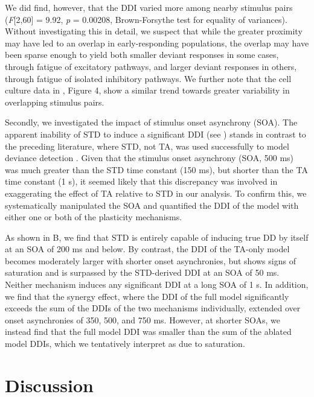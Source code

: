 \documentclass[9pt,lineno,onehalfspacing]{elife}
\begin{document}
We did find, however, that the DDI varied more among nearby stimulus pairs (\textit{F}[2,60] = 9.92, \textit{p} = 0.00208, Brown-Forsythe test for equality of variances). Without investigating this in detail, we suspect that while the greater proximity may have led to an overlap in early-responding populations, the overlap may have been sparse enough to yield both smaller deviant responses in some cases, through fatigue of excitatory pathways, and larger deviant responses in others, through fatigue of isolated inhibitory pathways. We further note that the cell culture data in \cite{Kubota2021-dx}, Figure 4, show a similar trend towards greater variability in overlapping stimulus pairs.

Secondly, we investigated the impact of stimulus onset asynchrony (SOA). The apparent inability of STD to induce a significant DDI (see ) stands in contrast to the preceding literature, where STD, not TA, was used successfully to model deviance detection \citep{Mill2011-ah, May2015-lt, Yarden2017-eh}. Given that the stimulus onset asynchrony (SOA, 500 ms) was much greater than the STD time constant (150 ms), but shorter than the TA time constant (1 s), it seemed likely that this discrepancy was involved in exaggerating the effect of TA relative to STD in our analysis. To confirm this, we systematically manipulated the SOA and quantified the DDI of the model with either one or both of the plasticity mechanisms.

As shown in B, we find that STD is entirely capable of inducing true DD by itself at an SOA of 200 ms and below. By contrast, the DDI of the TA-only model becomes moderately larger with shorter onset asynchronies, but shows signs of saturation and is surpassed by the STD-derived DDI at an SOA of 50 ms. Neither mechanism induces any significant DDI at a long SOA of 1 s. In addition, we find that the synergy effect, where the DDI of the full model significantly exceeds the sum of the DDIs of the two mechanisms individually, extended over onset asynchronies of 350, 500, and 750 ms. However, at shorter SOAs, we instead find that the full model DDI was smaller than the sum of the ablated model DDIs, which we tentatively interpret as due to saturation.

\section{Discussion}\label{sec:discussion}
\end{document}
